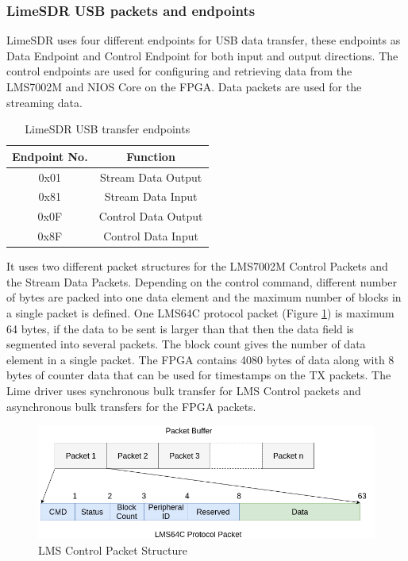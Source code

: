 \subsubsection{LimeSDR USB packets and endpoints}
LimeSDR uses four different endpoints for USB data transfer, these endpoints as Data Endpoint and Control Endpoint for both input and output directions. The control endpoints are used for configuring and retrieving data from the LMS7002M and NIOS Core on the FPGA. Data packets are used for the streaming data. 
\begin{table}[h!]
\centering
\begin{tabular}{|c|c|}
\hline
Endpoint No. & Function\\
\hline
0x01 & Stream Data Output\\
0x81 & Stream Data Input\\
0x0F & Control Data Output\\
0x8F & Control Data Input\\
\hline
\end{tabular}
\caption{LimeSDR USB transfer endpoints}
\end{table}
It uses two different packet structures for the LMS7002M Control Packets and the Stream Data Packets. Depending on the control command, different number of bytes are packed into one data element and the maximum number of blocks in a single packet is defined. One LMS64C protocol packet (Figure \ref{lms_packet}) is maximum 64 bytes, if the data to be sent is larger than that then the data field is segmented into several packets. The block count gives the number of data element in a single packet. The FPGA contains 4080 bytes of data along with 8 bytes of counter data that can be used for timestamps on the TX packets. The Lime driver uses synchronous bulk transfer for LMS Control packets and asynchronous bulk transfers for the FPGA packets.
\begin{figure}[h!]
\centering
\includegraphics[width=\textwidth]{Figure/LMS64C_Packet.png}
\caption{LMS Control Packet Structure}
\label{lms_packet}
\end{figure}

